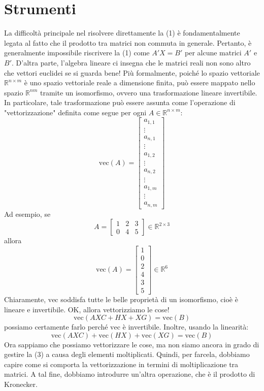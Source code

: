 \documentclass[11pt, a4paper]{article}
\begin{document}
\section{Strumenti}
La difficoltà principale nel risolvere direttamente la (1) è fondamentalmente legata al fatto che il prodotto tra matrici non commuta in generale. Pertanto, è generalmente impossibile riscrivere la (1) come $A'X = B'$ per alcune matrici $A'$ e $B'$. D'altra parte, l'algebra lineare ci insegna che le matrici reali non sono altro che vettori euclidei se si guarda bene! Più formalmente, poiché lo spazio vettoriale $\mathbb{R}^{n \times m}$ è uno spazio vettoriale reale a dimensione finita, può essere mappato nello spazio $\mathbb{R}^{nm}$ tramite un isomorfismo, ovvero una trasformazione lineare invertibile. In particolare, tale trasformazione può essere assunta come l'operazione di "vettorizzazione" definita come segue per ogni $A \in \mathbb{R}^{n \times m}$:
\[
\text{vec}(A) =
\begin{bmatrix}
a_{1,1} \\
\vdots \\
a_{n,1} \\
\vdots \\
a_{1,2} \\
\vdots \\
a_{n,2} \\
\vdots \\
a_{1,m} \\
\vdots \\
a_{n,m}
\end{bmatrix}
\]
Ad esempio, se
\[
A = \begin{bmatrix} 1 & 2 & 3 \\ 0 & 4 & 5 \end{bmatrix} \in \mathbb{R}^{2 \times 3}
\]
allora
\[
\text{vec}(A) = \begin{bmatrix} 1 \\ 0 \\ 2 \\ 4 \\ 3 \\ 5 \end{bmatrix} \in \mathbb{R}^6
\]
Chiaramente, $\text{vec}$ soddisfa tutte le belle proprietà di un isomorfismo, cioè è lineare e invertibile. OK, allora vettorizziamo le cose!
\begin{equation}
\text{vec}(AXC + HX + XG) = \text{vec}(B)
\end{equation}
possiamo certamente farlo perché $\text{vec}$ è invertibile. Inoltre, usando la linearità:
\begin{equation}
\text{vec}(AXC) + \text{vec}(HX) + \text{vec}(XG) = \text{vec}(B)
\end{equation}
Ora sappiamo che possiamo vettorizzare le cose, ma non siamo ancora in grado di gestire la (3) a causa degli elementi moltiplicati. Quindi, per farcela, dobbiamo capire come si comporta la vettorizzazione in termini di moltiplicazione tra matrici. A tal fine, dobbiamo introdurre un'altra operazione, che è il prodotto di Kronecker.
\end{document}
